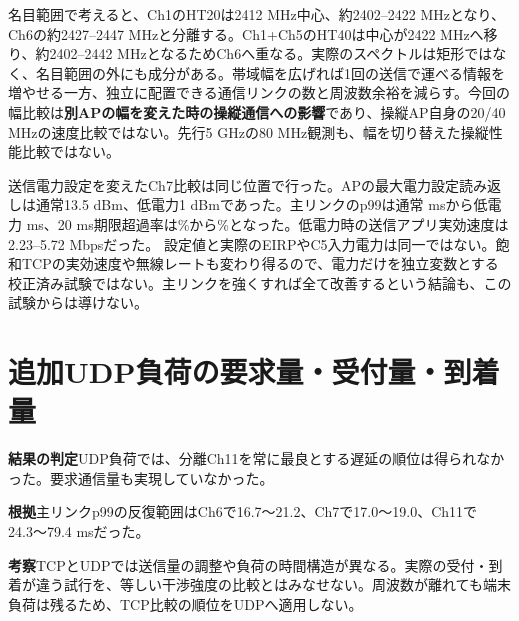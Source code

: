 \documentclass[a4paper,10pt]{ltjsarticle}
\begin{document}
名目範囲で考えると、Ch1のHT20は2412 MHz中心、約2402--2422 MHzとなり、Ch6の約2427--2447 MHzと分離する。Ch1+Ch5のHT40は中心が2422 MHzへ移り、約2402--2442 MHzとなるためCh6へ重なる。実際のスペクトルは矩形ではなく、名目範囲の外にも成分がある。帯域幅を広げれば1回の送信で運べる情報を増やせる一方、独立に配置できる通信リンクの数と周波数余裕を減らす\cite{ciscoRF}。今回の幅比較は\textbf{別APの幅を変えた時の操縦通信への影響}であり、操縦AP自身の20/40 MHzの速度比較ではない。先行5 GHzの80 MHz観測も、幅を切り替えた操縦性能比較ではない。

送信電力設定を変えたCh7比較は同じ位置で行った。APの最大電力設定読み返しは通常13.5 dBm、低電力1 dBmであった。主リンクのp99は通常\SevenPninetyNine{} msから低電力\LowPowerPninetyNine{} ms、20 ms期限超過率は\SevenDeadline{}\%から\LowPowerDeadline{}\%となった。低電力時の送信アプリ実効速度は2.23--5.72 Mbpsだった。
 設定値と実際のEIRPやC5入力電力は同一ではない。飽和TCPの実効速度や無線レートも変わり得るので、電力だけを独立変数とする校正済み試験ではない。主リンクを強くすれば全て改善するという結論も、この試験からは導けない。

\section{追加UDP負荷の要求量・受付量・到着量}
\par\smallskip\noindent\textbf{結果の判定}\quad UDP負荷では、分離Ch11を常に最良とする遅延の順位は得られなかった。要求通信量も実現していなかった。

\noindent\textbf{根拠}\quad 主リンクp99の反復範囲はCh6で16.7〜21.2、Ch7で17.0〜19.0、Ch11で24.3〜79.4 msだった。

\noindent\textbf{考察}\quad TCPとUDPでは送信量の調整や負荷の時間構造が異なる。実際の受付・到着が違う試行を、等しい干渉強度の比較とはみなせない。周波数が離れても端末負荷は残るため、TCP比較の順位をUDPへ適用しない。
\end{document}
